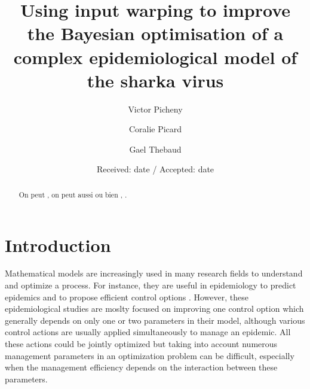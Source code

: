 \title{Using input warping to improve the Bayesian optimisation of a complex epidemiological model of the sharka virus %
}


\author{Victor Picheny         \and
        Coralie Picard        \and
        Gael Thebaud
}



\date{Received: date / Accepted: date}

\maketitle


\begin{abstract}
On peut  , on peut aussi  ou bien , .
\end{abstract}

\section{Introduction}

Mathematical models are increasingly used in many research fields to understand and optimize a process. For instance, 
they are useful in epidemiology to predict epidemics and to propose efficient control options 
\cite{cunniffe2015thirteen,cunniffe2016modeling,mushayabasa2015modeling,tildesley2006optimal,bajardi2012optimizing,kompas2017optimal,vanderwaal2017optimal,grechi2012designing}.
However, these epidemiological studies are moslty focused on improving one control option which generally depends on only one or two parameters in their model, 
although various control actions are usually applied simultaneously to manage an epidemic. All these actions could be jointly optimized but taking into account numerous management parameters in an optimization problem can be difficult,
especially when the management efficiency depends on the interaction between these parameters.

